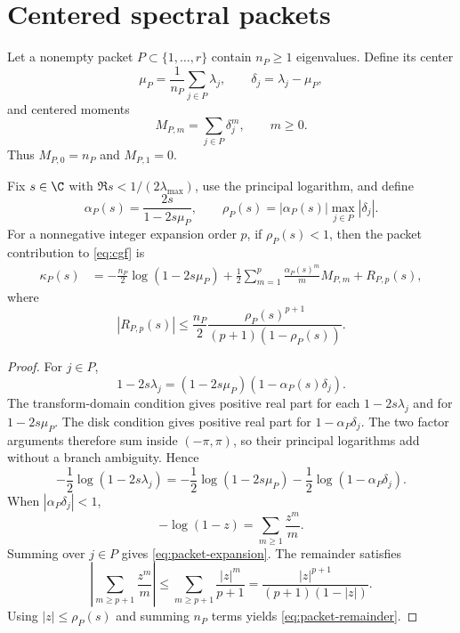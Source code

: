\section{Centered spectral packets}

Let a nonempty packet $P\subset\{1,\ldots,r\}$ contain $n_P\ge1$ eigenvalues. Define its center
\[
\mu_P=\frac{1}{n_P}\sum_{j\in P}\lambda_j,
\qquad
\delta_j=\lambda_j-\mu_P,
\]
and centered moments
\begin{equation}
M_{P,m}=\sum_{j\in P}\delta_j^m,
\qquad m\ge0.
\label{eq:centeredmoments}
\end{equation}
Thus $M_{P,0}=n_P$ and $M_{P,1}=0$.

\begin{theorem}
\label{thm:packet}
Fix $s\in\C$ with $\Re s<1/(2\lambda_{\max})$, use the principal logarithm, and define
\begin{equation}
\alpha_P(s)=\frac{2s}{1-2s\mu_P},
\qquad
\rho_P(s)=|\alpha_P(s)|\max_{j\in P}|\delta_j|.
\label{eq:alpha-rho}
\end{equation}
For a nonnegative integer expansion order $p$, if $\rho_P(s)<1$, then the packet contribution to \eqref{eq:cgf} is
\begin{align}
\kappa_P(s)
&=-\frac{n_P}{2}\log(1-2s\mu_P)
+\frac12\sum_{m=1}^{p}
\frac{\alpha_P(s)^m}{m}M_{P,m}
+R_{P,p}(s),
\label{eq:packet-expansion}
\end{align}
where
\begin{equation}
|R_{P,p}(s)|
\le
\frac{n_P}{2}
\frac{\rho_P(s)^{p+1}}{(p+1)(1-\rho_P(s))}.
\label{eq:packet-remainder}
\end{equation}
\end{theorem}

\begin{proof}
For $j\in P$,
\[
1-2s\lambda_j
=(1-2s\mu_P)(1-\alpha_P(s)\delta_j).
\]
The transform-domain condition gives positive real part for each
\(1-2s\lambda_j\) and for \(1-2s\mu_P\).  The disk condition gives
positive real part for \(1-\alpha_P\delta_j\).  The two factor arguments
therefore sum inside \((-\pi,\pi)\), so their principal logarithms add
without a branch ambiguity.  Hence
\[
-\frac12\log(1-2s\lambda_j)
=-\frac12\log(1-2s\mu_P)
-\frac12\log(1-\alpha_P\delta_j).
\]
When $|\alpha_P\delta_j|<1$,
\[
-\log(1-z)=\sum_{m\ge1}\frac{z^m}{m}.
\]
Summing over $j\in P$ gives \eqref{eq:packet-expansion}. The remainder satisfies
\[
\left|\sum_{m\ge p+1}\frac{z^m}{m}\right|
\le
\sum_{m\ge p+1}\frac{|z|^m}{p+1}
=\frac{|z|^{p+1}}{(p+1)(1-|z|)}.
\]
Using $|z|\le\rho_P(s)$ and summing $n_P$ terms yields \eqref{eq:packet-remainder}.
\end{proof}

